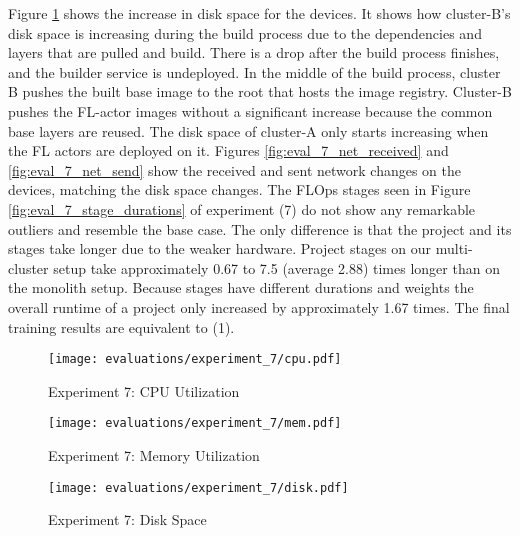 Figure \ref{fig:eval_7_disk_space} shows the increase in disk space for the devices.
It shows how cluster-B's disk space is increasing during the build process due to the dependencies and layers that are pulled and build.
There is a drop after the build process finishes, and the builder service is undeployed.
In the middle of the build process, cluster B pushes the built base image to the root that hosts the image registry.
Cluster-B pushes the FL-actor images without a significant increase because the common base layers are reused.
The disk space of cluster-A only starts increasing when the FL actors are deployed on it.
Figures \ref{fig:eval_7_net_received} and \ref{fig:eval_7_net_send} show the received and sent network changes on the devices, matching the disk space changes.
The FLOps stages seen in Figure \ref{fig:eval_7_stage_durations} of experiment (7) do not show any remarkable outliers and resemble the base case.
The only difference is that the project and its stages take longer due to the weaker hardware.
Project stages on our multi-cluster setup take approximately 0.67 to 7.5 (average 2.88) times longer than on the monolith setup.
Because stages have different durations and weights the overall runtime of a project only increased by approximately 1.67 times.
The final training results are equivalent to (1).



\begin{figure}[p]

    \begin{adjustwidth}{-0.2\paperwidth}{-0.2\paperwidth}
        \centering
        \texttt{[image: evaluations/experiment\_7/cpu.pdf]}
        \caption{Experiment 7: CPU Utilization}
        \label{fig:eval_7_cpu}
    \end{adjustwidth}

    \begin{adjustwidth}{-0.2\paperwidth}{-0.2\paperwidth}
        \centering
        \texttt{[image: evaluations/experiment\_7/mem.pdf]}
        \caption{Experiment 7: Memory Utilization}
        \label{fig:eval_7_mem}
    \end{adjustwidth}

    \begin{adjustwidth}{-0.2\paperwidth}{-0.2\paperwidth}
        \centering
        \texttt{[image: evaluations/experiment\_7/disk.pdf]}
        \caption{Experiment 7: Disk Space}
        \label{fig:eval_7_disk_space}
    \end{adjustwidth}
\end{figure}

